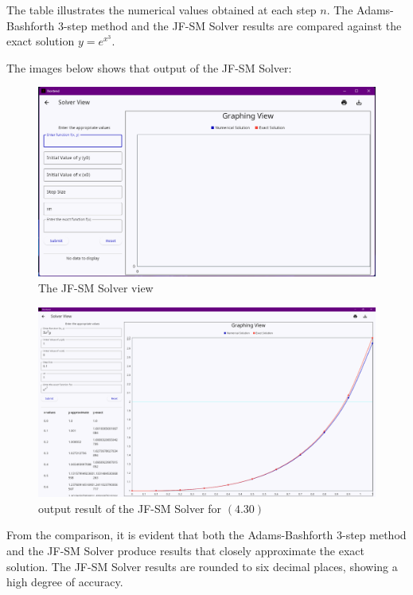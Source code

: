 The table illustrates the numerical values obtained at each step $n$. The Adams-Bashforth 3-step method and the JF-SM Solver results are compared against the exact solution $y = e^{x^3}$.

The images below shows that output of the JF-SM Solver:

\begin{figure}[htbp]
    \centering
    \includegraphics[width=1\textwidth]{chapters/4/image/solver_3.png}
    \caption{The JF-SM Solver view}
\end{figure}

\begin{figure}[htbp]
    \centering
    \includegraphics[width=1\textwidth]{chapters/4/image/solver_2.png}
    \caption{output result of the JF-SM Solver for $(4.30)$ }
\end{figure}


\pagebreak
From the comparison, it is evident that both the Adams-Bashforth 3-step method and the JF-SM Solver produce results that closely approximate the exact solution. The JF-SM Solver results are rounded to six decimal places, showing a high degree of accuracy.

